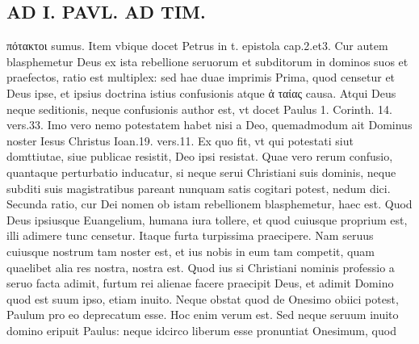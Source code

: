 \documentclass{article}
\begin{document}
\begin{pages}
\section*{AD I. PAVL. AD TIM. }
\marginpar{[ p.416 ]}\pstart πότακτοι sumus. Item vbique docet Petrus in t. epistola cap.2.et3.  \pend\pstart Cur autem blasphemetur Deus ex ista rebellione seruorum et subditorum in dominos suos et praefectos, ratio est multiplex: sed hae duae imprimis  \pend\pstart Prima, quod censetur et Deus ipse, et ipsius doctrina istius confusionis atque ἀ ταίας causa. Atqui Deus neque seditionis, neque confusionis author est, vt docet Paulus 1. Corinth. 14. vers.33. Imo vero nemo potestatem habet nisi a Deo, quemadmodum ait Dominus noster Iesus Christus Ioan.19. vers.11. Ex quo fit, vt qui potestati siut domttiutae, siue publicae resistit, Deo ipsi resistat. Quae vero rerum confusio, quantaque perturbatio inducatur, si neque serui Christiani suis dominis, neque subditi suis magistratibus pareant nunquam satis cogitari potest, nedum dici.  \pend\pstart Secunda ratio, cur Dei nomen ob istam rebellionem blasphemetur, haec est. Quod Deus ipsiusque Euangelium, humana iura tollere, et quod cuiusque proprium est, illi adimere tunc censetur. Itaque furta turpissima praecipere. Nam seruus cuiusque nostrum tam noster est, et ius nobis in eum tam competit, quam quaelibet alia res nostra, nostra est. Quod ius si Christiani nominis professio a seruo facta adimit, furtum rei alienae facere praecipit Deus, et adimit Domino quod est suum ipso, etiam inuito. Neque obstat quod de Onesimo obiici potest, Paulum pro eo deprecatum esse. Hoc enim verum est. Sed neque  seruum inuito domino eripuit Paulus: neque idcirco liberum esse pronuntiat Onesimum, quod  \pend

\end{pages}
\end{document}
